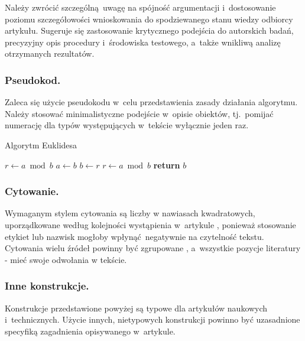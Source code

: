 Należy zwrócić szczególną uwagę na spójność argumentacji i~dostosowanie poziomu szczegółowości wnioskowania do spodziewanego stanu wiedzy odbiorcy artykułu. Sugeruje się zastosowanie krytycznego podejścia do autorskich badań, precyzyjny opis procedury i~środowiska testowego, a~także wnikliwą analizę otrzymanych rezultatów.

\subsubsection{Pseudokod.}
\label{subsubsec:pseudocode}

Zaleca się użycie pseudokodu w~celu przedstawienia zasady działania algorytmu. Należy stosować minimalistyczne podejście w~opisie obiektów, tj.~pomijać numerację dla typów występujących w~tekście wyłącznie jeden raz.

\vspace{-4mm}
\begin{algorithm}
	\renewcommand{\thealgorithm}{} %
	\caption{Algorytm Euklidesa} \label{alg:euclid}
	\begin{algorithmic}[1]
		 
			\State $r\gets a\bmod b$
			 
				\State $a\gets b$
				\State $b\gets r$
				\State $r\gets a\bmod b$
			\EndWhile \label{alg:euclid:endwhile}
			\State \textbf{return} $b$
		\EndProcedure
	\end{algorithmic}
\end{algorithm}
\vspace{-8mm}

\subsubsection{Cytowanie.}
\label{subsubsec:cite}

Wymaganym stylem cytowania są liczby w nawiasach kwadratowych, uporządkowane według kolejności wystąpienia w~artykule \cite{ref:lncs}, ponieważ stosowanie etykiet lub nazwisk mogłoby wpłynąć negatywnie na czytelność tekstu. Cytowania wielu źródeł powinny być zgrupowane \cite{ref:lncs,ref:latex}, a~wszystkie pozycje literatury - mieć swoje odwołania w tekście.

\subsubsection{Inne konstrukcje.}
\label{subsubsec:others}

Konstrukcje przedstawione powyżej są typowe dla artykułów naukowych i~technicznych. Użycie innych, nietypowych konstrukcji powinno być uzasadnione specyfiką zagadnienia opisywanego w~artykule.
